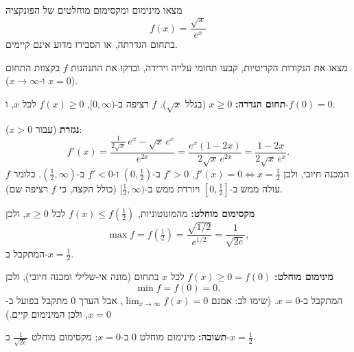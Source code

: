 
\begin{question}
מצאו מינימום ומקסימום מוחלטים של הפונקציה
\[ f(x) = \frac{\sqrt{x}}{e^x} \]
בתחום הגדרתה, או הסבירו מדוע אינם קיימים.
\end{question}

\begin{hint}
מצאו את הנקודות הקריטיות, קבעו תחומי עלייה וירידה, ובדקו את התנהגות $f$ בקצוות התחום ($x = 0$ ו-$x \to \infty$).
\end{hint}

\begin{solution}
\textbf{תחום הגדרה:} $x \ge 0$ (בגלל $\sqrt{x}$). $f$ רציפה ב-$[0,\infty)$, $f(x) \ge 0$ לכל $x$, ו-$f(0) = 0$.

\textbf{נגזרת} (עבור $x > 0$):
\[ f'(x) = \frac{\frac{1}{2\sqrt{x}}\, e^x - \sqrt{x}\, e^x}{e^{2x}} = \frac{e^x(1 - 2x)}{2\sqrt{x}\, e^{2x}} = \frac{1 - 2x}{2\sqrt{x}\, e^x}. \]
המכנה חיובי, ולכן $f'(x) = 0 \iff x = \frac12$, $f' > 0$ ב-$(0, \frac12)$ ו-$f' < 0$ ב-$(\frac12, \infty)$.
כלומר $f$ עולה ממש ב-$[0, \frac12]$ ויורדת ממש ב-$[\frac12, \infty)$ (כולל הקצה, כי $f$ רציפה שם).

\textbf{מקסימום מוחלט:} מהמונוטוניות, $f(x) \le f(\frac12)$ לכל $x \ge 0$, ולכן
\[ \max f = f\left(\tfrac12\right) = \frac{\sqrt{1/2}}{e^{1/2}} = \frac{1}{\sqrt{2e}}, \]
המתקבל ב-$x = \frac12$.

\textbf{מינימום מוחלט:} $f(x) \ge 0 = f(0)$ לכל $x$ בתחום (מונה אי-שלילי ומכנה חיובי), ולכן
\[ \min f = f(0) = 0, \]
המתקבל ב-$x = 0$. (שימו לב: אמנם $\lim_{x\to\infty} f(x) = 0$, אבל הערך $0$ מתקבל בפועל ב-$x = 0$, ולכן המינימום קיים.)

\textbf{תשובה:} מינימום מוחלט $0$ ב-$x = 0$; מקסימום מוחלט $\frac{1}{\sqrt{2e}}$ ב-$x = \frac12$.
\end{solution}

